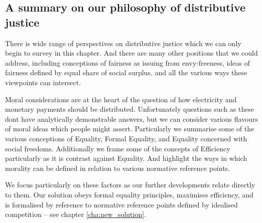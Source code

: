 \subsection{A summary on our philosophy of distributive justice}


There is wide range of perspectives on distributive justice which we can only begin to survey in this chapter.
And there are many other positions that we could address, including conceptions of fairness as issuing from envy-freeness, ideas of fairness defined by equal share of social surplus, and all the various ways these viewpoints can intersect.%

Moral considerations are at the heart of the question of how electricity and monetary payments should be distributed.
Unfortunately questions such as these dont have analytically demonstrable answers, but we can consider various flavours of moral ideas which people might assert.
Particularly we summarise some of the various conceptions of Equality, Formal Equality, and Equality concerned with social freedoms.
Additionally we frame some of the concepts of Efficiency particularly as it is contrast against Equality.
And highlight the ways in which morality can be defined in relation to various normative reference points.

We focus particularly on these factors as our further developments relate directly to them.
Our solution obeys formal equality principles, maximises efficiency, and is formalised by reference to normative reference points defined by idealised competition -- see chapter \ref{cha:new_solution}.




